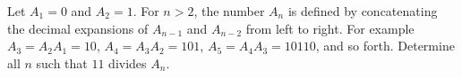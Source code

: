 Let $A_1=0$ and $A_2=1$.  For $n>2$, the number $A_n$ is defined by
concatenating the decimal expansions of $A_{n-1}$ and $A_{n-2}$ from
left to right.  For example $A_3=A_2 A_1=10$, $A_4=A_3 A_2 = 101$,
$A_5=A_4 A_3 = 10110$, and so forth.  Determine all $n$ such that
$11$ divides $A_n$.
